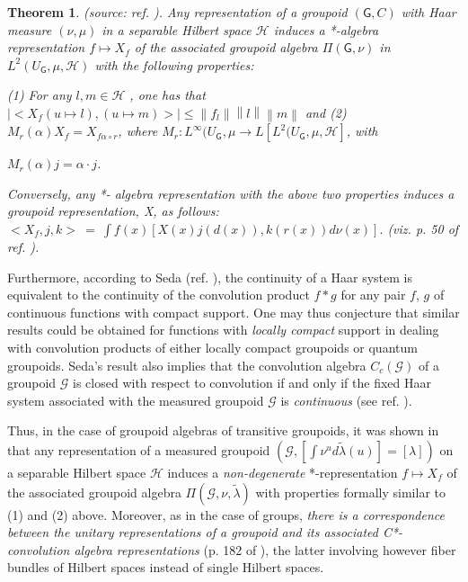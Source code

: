 \documentclass[12pt]{article}
\theoremstyle{plain}
\newtheorem{theorem}{Theorem}[section]
\theoremstyle{definition}
\numberwithin{equation}{section}
\newcommand{\G}{\mathcal G}
\renewcommand{\H}{\mathcal H}
\newcommand{\grp}{{\mathsf{G}}}
\newcommand{\med}{\medbreak}
\newcommand{\<}{{\langle}}
\begin{document}
\begin{theorem} 
(source: ref. \cite{PH78}). Any representation of a groupoid $(\grp,C)$ with Haar measure $(\nu, \mu)$ in a separable Hilbert space $\H$ induces a *-algebra representation $f \mapsto X_f$ of the associated 
groupoid algebra $ \Pi (\grp, \nu)$ in $L^2 (U_{\grp} , \mu, \H )$ with the following properties:

(1)  For any $l,m \in \H $ , one has that $\left|<X_f(u \mapsto l), (u \mapsto m)>\right|\leq \left\|f_l\right\| \left\|l \right\| \left\|m \right\|$ and
\med
(2)  $M_r (\alpha) X_f = X_{f \alpha \circ r}$,  where
\med 
  $M_r: L^\infty (U_{\grp}, \mu   \longrightarrow L[L^2 (U_{\grp}, \mu, \H]$, with
  
  $M_r (\alpha)j = \alpha \cdot j$.

\textit{Conversely, any *- algebra representation with the above two properties induces a groupoid representation, X, as follows:}
\med
$<X_f , j, k> ~ = ~ \displaystyle{\int} f(x)[X(x)j(d(x)),k(r(x))d \nu (x)].$
(viz. p. 50 of ref. \cite{PH78}).
\end{theorem}

Furthermore, according to Seda (ref. \cite {Seda86,Seda2k8}), the continuity of a Haar system is equivalent to the continuity of the convolution product $f*g$ for any pair $f$, $g$ of continuous functions with compact support. One may thus conjecture that similar results could be obtained for functions with \textit{locally compact} support in dealing with convolution products of either locally compact groupoids or quantum groupoids. Seda's result also implies that the convolution algebra $C_c (\G)$ of a groupoid $\G$ is closed with respect to convolution if and only if the fixed Haar system associated with the measured groupoid $\G$ is \textit{continuous} (see ref. \cite{MAB2k3}).

Thus, in the case of groupoid algebras of transitive groupoids, it was shown in \cite{MAB2k3} that any representation of a measured groupoid $(\G, [\displaystyle{\int} \nu ^u d \tilde{\lambda}(u)] = [\lambda])$ on a separable Hilbert space $\H$ induces a \textit{non-degenerate} *-representation  $f \mapsto  X_f$ of the associated groupoid algebra 
$\Pi (\G, \nu,\tilde{\lambda})$ with properties formally similar to (1) and (2) above.  
Moreover, as in the case of groups, \emph{there is a correspondence between the unitary representations of a groupoid and its associated C*-convolution algebra representations} (p. 182 of \cite{MAB2k3}), the latter involving however fiber bundles of Hilbert spaces instead of single Hilbert spaces.
\end{document}
